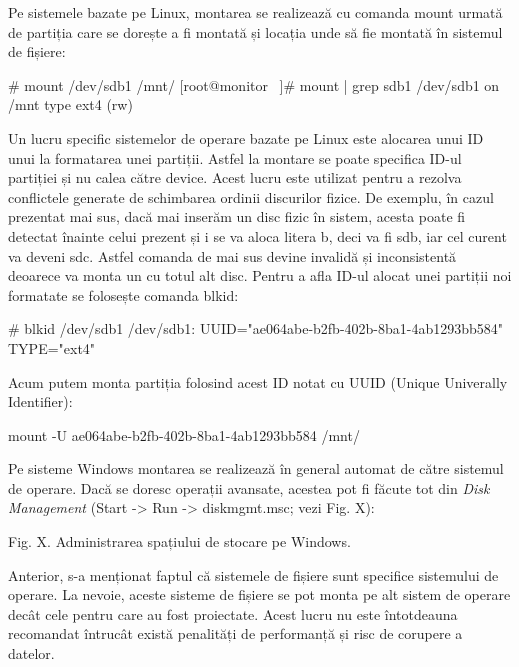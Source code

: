Pe sistemele bazate pe Linux, montarea se realizează cu comanda mount urmată de
partiția care se dorește a fi montată și locația unde să fie montată în sistemul
de fișiere:

\begin{screen}
# mount /dev/sdb1 /mnt/
[root@monitor ~]# mount | grep sdb1
/dev/sdb1 on /mnt type ext4 (rw)
\end{screen}

Un lucru specific sistemelor de operare bazate pe Linux este alocarea unui ID
unui la formatarea unei partiții. Astfel la montare se poate specifica ID-ul
partiției și nu calea către device. Acest lucru este utilizat pentru a rezolva
conflictele generate de schimbarea ordinii discurilor fizice. De exemplu, în
cazul prezentat mai sus, dacă mai inserăm un disc fizic în sistem, acesta poate
fi detectat înainte celui prezent și i se va aloca litera b, deci va fi sdb, iar
cel curent va deveni sdc. Astfel comanda de mai sus devine invalidă și
inconsistentă deoarece va monta un cu totul alt disc. Pentru a afla ID-ul alocat
unei partiții noi formatate se folosește comanda blkid:

\begin{screen}
# blkid /dev/sdb1
/dev/sdb1: UUID="ae064abe-b2fb-402b-8ba1-4ab1293bb584" TYPE="ext4"
\end{screen}

Acum putem monta partiția folosind acest ID notat cu UUID (Unique Univerally
Identifier):

\begin{screen}
mount -U ae064abe-b2fb-402b-8ba1-4ab1293bb584 /mnt/
\end{screen}


Pe sisteme Windows montarea se realizează în general automat de către sistemul
de operare. Dacă se doresc operații avansate, acestea pot fi făcute tot din
\textit{Disk Management} (Start -> Run -> diskmgmt.msc; vezi Fig. X):

Fig. X. Administrarea spațiului de stocare pe Windows.

Anterior, s-a menționat faptul că sistemele de fișiere sunt specifice sistemului
de operare. La nevoie, aceste sisteme de fișiere se pot monta pe alt sistem de
operare decât cele pentru care au fost proiectate. Acest lucru nu este
întotdeauna recomandat întrucât există penalități de performanță și risc de
corupere a datelor.

